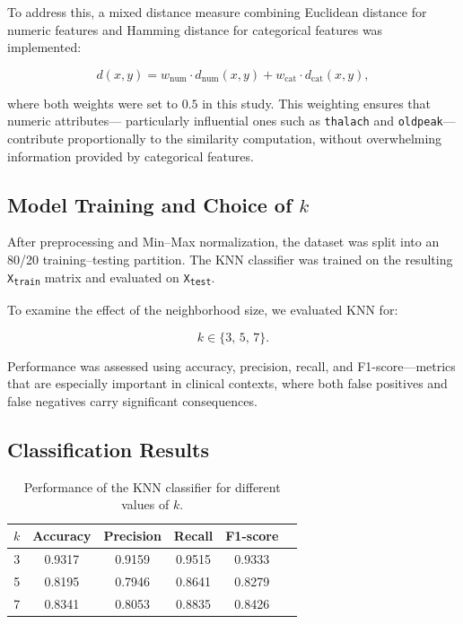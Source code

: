 To address this, a mixed distance measure combining Euclidean distance for numeric features and Hamming
distance for categorical features was implemented:

\[
d(x,y) = w_{\text{num}} \cdot d_{\text{num}}(x,y) +
w_{\text{cat}} \cdot d_{\text{cat}}(x,y),
\]

where both weights were set to $0.5$ in this study. This weighting ensures that numeric attributes—
particularly influential ones such as \texttt{thalach} and \texttt{oldpeak}—contribute proportionally
to the similarity computation, without overwhelming information provided by categorical features.

\subsection{Model Training and Choice of $k$}

After preprocessing and Min--Max normalization, the dataset was split into an 80/20 training–testing partition.
The KNN classifier was trained on the resulting \texttt{X\textsubscript{train}} matrix and evaluated on
\texttt{X\textsubscript{test}}.

To examine the effect of the neighborhood size, we evaluated KNN for:

\[
k \in \{3,\,5,\,7\}.
\]

Performance was assessed using accuracy, precision, recall, and F1-score—metrics that are especially
important in clinical contexts, where both false positives and false negatives carry significant
consequences.

\subsection{Classification Results}

\begin{table}[H]
	\centering
	\caption{Performance of the KNN classifier for different values of $k$.}
	\label{table:knn-results}
	\begin{tabular}{cccccc}
		\toprule
		$k$ & Accuracy & Precision & Recall & F1-score \\
		\midrule
		3 & 0.9317 & 0.9159 & 0.9515 & 0.9333 \\
		5 & 0.8195 & 0.7946 & 0.8641 & 0.8279 \\
		7 & 0.8341 & 0.8053 & 0.8835 & 0.8426 \\
		\bottomrule
	\end{tabular}
\end{table}

